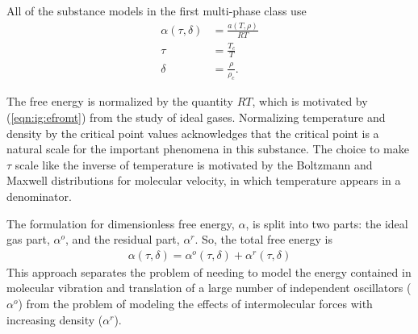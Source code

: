 All of the substance models in the first multi-phase class use
\begin{subequations}
\begin{align}
\alpha(\tau,\delta) &= \frac{a(T,\rho)}{R T}\\
\tau &= \frac{T_c}{T}\\
\delta &= \frac{\rho}{\rho_c}.
\end{align}
\end{subequations}

The free energy is normalized by the quantity $R T$, which is motivated by (\ref{eqn:ig:efromt}) from the study of ideal gases.  Normalizing temperature and density by the critical point values acknowledges that the critical point is a natural scale for the important phenomena in this substance.  The choice to make $\tau$ scale like the inverse of temperature is motivated by the Boltzmann and Maxwell distributions for molecular velocity, in which temperature appears in a denominator.

The formulation for dimensionless free energy, $\alpha$, is split into two parts: the ideal gas part, $\alpha^o$, and the residual part, $\alpha^r$.  So, the total free energy is
\begin{align}
\alpha(\tau, \delta) = \alpha^o(\tau, \delta) + \alpha^r(\tau, \delta)
\end{align}
This approach separates the problem of needing to model the energy contained in molecular vibration and translation of a large number of independent oscillators ($\alpha^o$) from the problem of modeling the effects of intermolecular forces with increasing density ($\alpha^r$).

